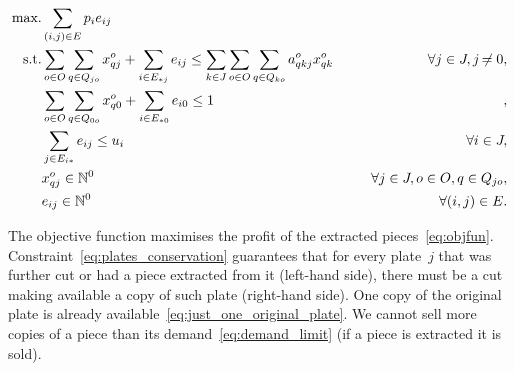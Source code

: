 \documentclass[9pt]{entcs}
\begin{document}
\begin{align}
\mbox{max.} &\sum_{(i, j) \in E} p_i e_{ij} \label{eq:objfun}\\
\mbox{s.t.} &\sum_{o \in O}\sum_{q \in Q_{jo}} x^o_{qj} + \sum_{i \in E_{*j}} e_{ij} \leq \sum_{k \in J}\sum_{o \in O}\sum_{q \in Q_{ko}} a^o_{qkj} x^o_{qk} \hspace*{0.05\textwidth} & \forall j \in J, j \neq 0,\label{eq:plates_conservation}\\
	& \sum_{o \in O}\sum_{q \in Q_{0o}} x^o_{q0} + \sum_{i \in E_{*0}} e_{i0} \leq 1 &,\label{eq:just_one_original_plate}\\
	& \sum_{j \in E_{i*}} e_{ij} \leq u_i & \forall i \in \bar{J},\label{eq:demand_limit}\\
	& x^o_{qj} \in \mathbb{N}^0 & \forall j \in J, o \in O, q \in Q_{jo},\label{eq:trivial_x}\\
	& e_{ij} \in \mathbb{N}^0 & \forall (i, j) \in E.\label{eq:trivial_e}
\end{align}
\begin{comment}
\begin{align}
\bm{max.} &\sum_{(i, j) \in E} p_i e_{ij} \label{eq:objfun}\\
\bm{s.t.} &\specialcell{\sum_{o \in O}\sum_{q \in Q_{jo}} x^o_{qj} + \sum_{i \in E_{*j}} e_{ij} \leq \sum_{k \in J}\sum_{o \in O}\sum_{q \in Q_{ko}} a^o_{qkj} x^o_{qk} \hspace*{0.05\textwidth} \forall j \in J, j \neq 0,}\label{eq:plates_conservation}\\
	    & \specialcell{\sum_{o \in O}\sum_{q \in Q_{0o}} x^o_{q0} + \sum_{i \in E_{*0}} e_{i0} \leq 1 \hspace*{\fill},}\label{eq:just_one_original_plate}\\
            & \specialcell{\sum_{j \in E_{i*}} e_{ij} \leq u_i \hspace*{\fill} \forall i \in \bar{J},}\label{eq:demand_limit}\\
	    & \specialcell{x^o_{qj} \in \mathbb{N}^0 \hspace*{\fill} \forall j \in J, o \in O, q \in Q_{jo},}\label{eq:trivial_x}\\
            & \specialcell{e_{ij} \in \mathbb{N}^0 \hspace*{\fill} \forall (i, j) \in E.}\label{eq:trivial_e}
\end{align}
\end{comment}

The objective function maximises the profit of the extracted pieces~\eqref{eq:objfun}.
Constraint~\eqref{eq:plates_conservation} guarantees that for every plate~\(j\) that was further cut or had a piece extracted from it (left-hand side), there must be a cut making available a copy of such plate (right-hand side).
One copy of the original plate is already available~\eqref{eq:just_one_original_plate}.
We cannot sell more copies of a piece than its demand~\eqref{eq:demand_limit} (if a piece is extracted it is sold).
\end{document}
